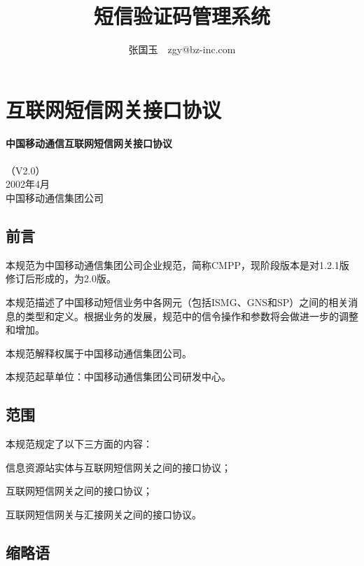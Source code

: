 \documentclass[11pt]{book} %
\title{短信验证码管理系统}
\author{张国玉~~zgy@bz-inc.com}
\begin{document}
\maketitle
\tableofcontents
\listoffigures
\listoftables
\printindex




\part{互联网短信网关接口协议}

\begin{center}
\textbf{\huge 中国移动通信互联网短信网关接口协议}\\ \bigskip \bigskip {} \\ {\large（V2.0）} \bigskip \\ \bigskip 2002年4月\\ \vfill 中国移动通信集团公司
\end{center}

\chapter{前言}

本规范为中国移动通信集团公司企业规范，简称CMPP，现阶段版本是对1.2.1版修订后形成的，为2.0版。

本规范描述了中国移动短信业务中各网元（包括ISMG、GNS和SP）之间的相关消息的类型和定义。根据业务的发展，规范中的信令操作和参数将会做进一步的调整和增加。

本规范解释权属于中国移动通信集团公司。

本规范起草单位：中国移动通信集团公司研发中心。


\chapter{范围}

本规范规定了以下三方面的内容：

\begin{compactenum}
\item 信息资源站实体与互联网短信网关之间的接口协议；
\item 互联网短信网关之间的接口协议；
\item 互联网短信网关与汇接网关之间的接口协议。
\end{compactenum}


\chapter{缩略语}
\end{document}
